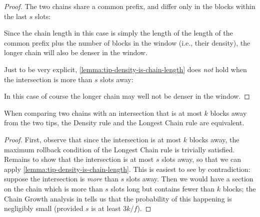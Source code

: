 \begin{proof}
The two chains share a common prefix, and differ only in the blocks
within the last $s$ slots:
%
\begin{center}
\end{center}
%
Since the chain length in this case is simply the length of the length of the
common prefix plus the number of blocks in the window (i.e., their density),
the longer chain will also be denser in the window.

Just to be very explicit, \cref{lemma:tip-density-is-chain-length} does
\emph{not} hold when the intersection is more than $s$ slots away:
%
\begin{center}
\end{center}
%
In this case of course the longer chain may well not be denser in the window.
\end{proof}

\clearpage

\begin{lemma}
\label{lemma:rule-equivalence}
When comparing two chains with an intersection that is at most $k$ blocks away
from the two tips, the Density rule and the Longest Chain rule are equivalent.
\end{lemma}

\begin{proof}
First, observe that since the intersection is at most $k$ blocks away, the
maximum rollback condition of the Longest Chain rule is trivially satisfied.
Remains to show that the intersection is at most $s$ slots away, so that we can
apply \cref{lemma:tip-density-is-chain-length}. This is easiest to see by
contradiction: suppose the intersection is \emph{more} than $s$ slots away. Then
we would have a section on the chain which is more than $s$ slots long but
contains fewer than $k$ blocks; the Chain Growth analysis in
\cite{cryptoeprint:2017:573,cryptoeprint:2018:378} tells us that the probability
of this happening is negligibly small (provided $s$ is at least $3k/f$).
\end{proof}

